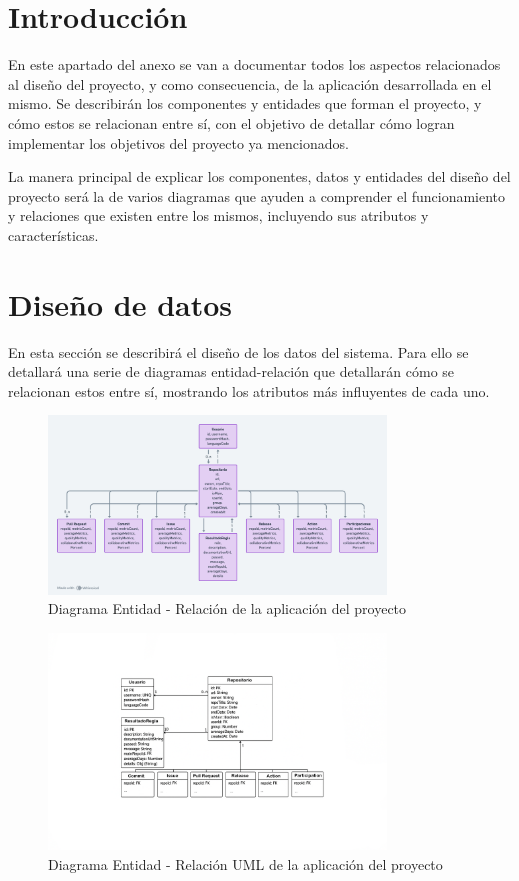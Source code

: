 
\section{Introducción}
En este apartado del anexo se van a documentar todos los aspectos relacionados al diseño del proyecto, y como consecuencia, de la aplicación desarrollada en el mismo. Se describirán los componentes y entidades que forman el proyecto, y cómo estos se relacionan entre sí, con el objetivo de detallar cómo logran implementar los objetivos del proyecto ya mencionados.

La manera principal de explicar los componentes, datos y entidades del diseño del proyecto será la de varios diagramas que ayuden a comprender el funcionamiento y relaciones que existen entre los mismos, incluyendo sus atributos y características.

\section{Diseño de datos}

En esta sección se describirá el diseño de los datos del sistema. Para ello se detallará una serie de diagramas entidad-relación que detallarán cómo se relacionan estos entre sí, mostrando los atributos más influyentes de cada uno. 

\begin{figure}[H]
\centering
\includegraphics[width=0.8\textwidth]{img/Diagrama-entidad-relacion.png}
\caption{Diagrama Entidad - Relación de la aplicación del proyecto}
\label{fig:DiagramaER}
\end{figure}

\begin{figure}[H]
\centering
\includegraphics[width=0.8\textwidth]{img/Diagrama-entidad-relacionUML.png}
\caption{Diagrama Entidad - Relación UML de la aplicación del proyecto}
\label{fig:DiagramaER_UML}
\end{figure}


